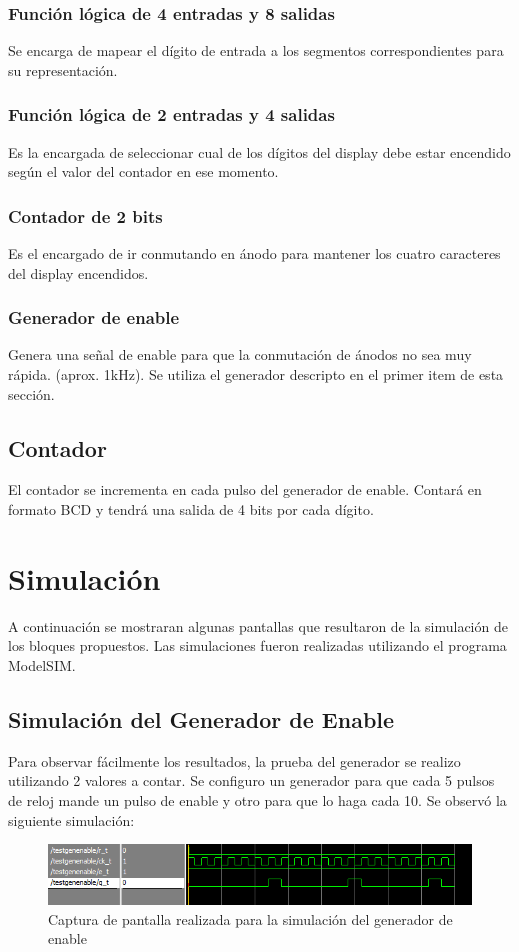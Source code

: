 \documentclass[a4paper,10pt]{article}
\begin{document}
		\subsubsection{Función lógica de 4 entradas y 8 salidas}
		Se encarga de mapear el dígito de entrada a los segmentos correspondientes para su representación.
		\subsubsection{Función lógica de 2 entradas y 4 salidas}
		Es la encargada de seleccionar cual de los dígitos del display debe estar encendido según el valor del contador en ese momento. 
		\subsubsection{Contador de 2 bits}
		Es el encargado de ir conmutando en ánodo para mantener los cuatro caracteres del display encendidos.					\subsubsection{Generador de enable}
		Genera una señal de enable para que la conmutación de ánodos no sea muy rápida. (aprox. 1kHz). Se utiliza el generador descripto en el primer item de esta sección.
	\subsection{Contador}
	El contador se incrementa en cada pulso del generador de enable. Contará en formato BCD y tendrá una salida de 4 bits por cada dígito.

\section{Simulación}
A continuación se mostraran algunas pantallas que resultaron de la simulación de los bloques propuestos. Las simulaciones fueron realizadas utilizando el programa ModelSIM.
	\subsection{Simulación del Generador de Enable}
	Para observar fácilmente los resultados, la prueba del generador se realizo utilizando 2 valores a contar. Se configuro un generador para que cada 5 pulsos de reloj mande un pulso de enable y otro para que lo haga cada 10.
	Se observó la siguiente simulación:
	 \begin{figure}[H]
		\centering
		\includegraphics[scale=0.5]{sim-genen.png}
		\caption{Captura de pantalla realizada para la simulación del generador de enable}
		\label{fig:sim_gen}
	\end{figure}
		
\end{document}

